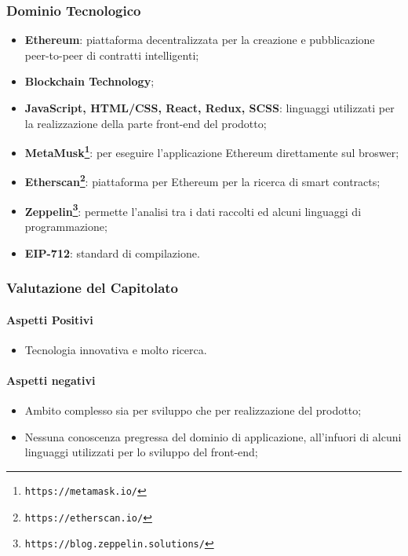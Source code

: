 \subsubsection{Dominio Tecnologico}

\begin{itemize}
  \item \textbf{Ethereum\glossario}: piattaforma decentralizzata per la creazione e pubblicazione peer-to-peer di contratti intelligenti;
  \item \textbf{Blockchain Technology\glossario};
  \item \textbf{JavaScript, HTML/CSS, React\glossario, Redux\glossario, SCSS\glossario}: linguaggi utilizzati per la realizzazione della parte front-end del prodotto;
  \item \textbf{MetaMusk\footnote{\texttt{https://metamask.io/}}\glossario}: per eseguire l'applicazione Ethereum direttamente sul broswer;
  \item \textbf{Etherscan\footnote{\texttt{https://etherscan.io/}}\glossario}: piattaforma per Ethereum per la ricerca di smart contracts;
  \item \textbf{Zeppelin\footnote{\texttt{https://blog.zeppelin.solutions/}}\glossario}: permette l'analisi tra i dati raccolti ed alcuni linguaggi di programmazione;
  \item \textbf{EIP-712}: standard di compilazione.
\end{itemize}

\subsubsection{Valutazione del Capitolato}
\paragraph{Aspetti Positivi}
\begin{itemize}
  \item Tecnologia innovativa e molto ricerca.
\end{itemize}

\paragraph{Aspetti negativi}
\begin{itemize}
  \item Ambito complesso sia per sviluppo che per realizzazione del prodotto;
  \item Nessuna conoscenza pregressa del dominio di applicazione, all'infuori di alcuni linguaggi utilizzati per lo sviluppo del front-end;
\end{itemize}

